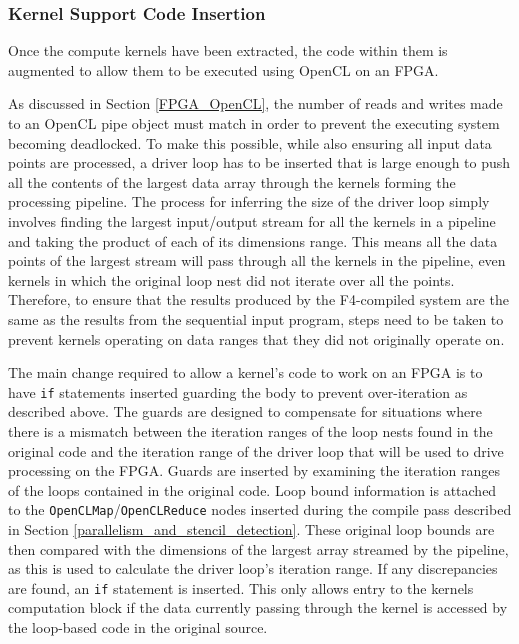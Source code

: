 \documentclass{mpaper}
\begin{document}
\subsubsection*{Kernel Support Code Insertion}
\label{support_code_insertion}

Once the compute kernels have been extracted, the code within them is augmented to allow them to be executed using OpenCL on an FPGA.

As discussed in Section \ref{FPGA_OpenCL}, the number of reads and writes made to an OpenCL pipe object must match in order to prevent the executing system becoming deadlocked.
To make this possible, while also ensuring all input data points are processed, a driver loop has to be inserted that is large enough to push all the contents of the largest data array through the kernels forming the processing pipeline.
The process for inferring the size of the driver loop simply involves finding the largest input/output stream for all the kernels in a pipeline and taking the product of each of its dimensions range.
This means all the data points of the largest stream will pass through all the kernels in the pipeline, even kernels in which the original loop nest did not iterate over all the points.
Therefore, to ensure that the results produced by the F4-compiled system are the same as the results from the sequential input program, steps need to be taken to prevent kernels operating on data ranges that they did not originally operate on.

The main change required to allow a kernel's code to work on an FPGA is to have \texttt{if} statements inserted guarding the body to prevent over-iteration as described above. 
The guards are designed to compensate for situations where there is a mismatch between the iteration ranges of the loop nests found in the original code and the iteration range of the driver loop that will be used to drive processing on the FPGA. 
Guards are inserted by examining the iteration ranges of the loops contained in the original code. 
Loop bound information is attached to the \texttt{OpenCLMap}/\texttt{OpenCLReduce} nodes inserted during the compile pass described in Section \ref{parallelism_and_stencil_detection}.
These original loop bounds are then compared with the dimensions of the largest array streamed by the pipeline, as this is used to calculate the driver loop's iteration range.
If any discrepancies are found, an \texttt{if} statement is inserted.
This only allows entry to the kernels computation block if the data currently passing through the kernel is accessed by the loop-based code in the original source. 
\end{document}
